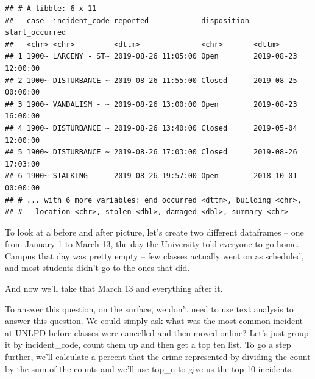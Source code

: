 \documentclass[]{book}
\newenvironment{Shaded}{\begin{snugshade}}{\end{snugshade}}
\newcommand{\KeywordTok}[1]{\textcolor[rgb]{0.13,0.29,0.53}{\textbf{#1}}}
\newcommand{\NormalTok}[1]{#1}
\newcommand{\OperatorTok}[1]{\textcolor[rgb]{0.81,0.36,0.00}{\textbf{#1}}}
\newcommand{\StringTok}[1]{\textcolor[rgb]{0.31,0.60,0.02}{#1}}
\begin{document}
\begin{verbatim}
## # A tibble: 6 x 11
##   case  incident_code reported            disposition start_occurred     
##   <chr> <chr>         <dttm>              <chr>       <dttm>             
## 1 1900~ LARCENY - ST~ 2019-08-26 11:05:00 Open        2019-08-23 12:00:00
## 2 1900~ DISTURBANCE ~ 2019-08-26 11:55:00 Closed      2019-08-25 00:00:00
## 3 1900~ VANDALISM - ~ 2019-08-26 13:00:00 Open        2019-08-23 16:00:00
## 4 1900~ DISTURBANCE ~ 2019-08-26 13:40:00 Closed      2019-05-04 12:00:00
## 5 1900~ DISTURBANCE ~ 2019-08-26 17:03:00 Closed      2019-08-26 17:03:00
## 6 1900~ STALKING      2019-08-26 19:57:00 Open        2018-10-01 00:00:00
## # ... with 6 more variables: end_occurred <dttm>, building <chr>,
## #   location <chr>, stolen <dbl>, damaged <dbl>, summary <chr>
\end{verbatim}

To look at a before and after picture, let's create two different dataframes -- one from January 1 to March 13, the day the University told everyone to go home. Campus that day was pretty empty -- few classes actually went on as scheduled, and most students didn't go to the ones that did.

\begin{Shaded}
\end{Shaded}

And now we'll take that March 13 and everything after it.

\begin{Shaded}
\end{Shaded}

To answer this question, on the surface, we don't need to use text analysis to answer this question. We could simply ask what was the most common incident at UNLPD before classes were cancelled and then moved online? Let's just group it by incident\_code, count them up and then get a top ten list. To go a step further, we'll calculate a percent that the crime represented by dividing the count by the sum of the counts and we'll use top\_n to give us the top 10 incidents.
\end{document}
